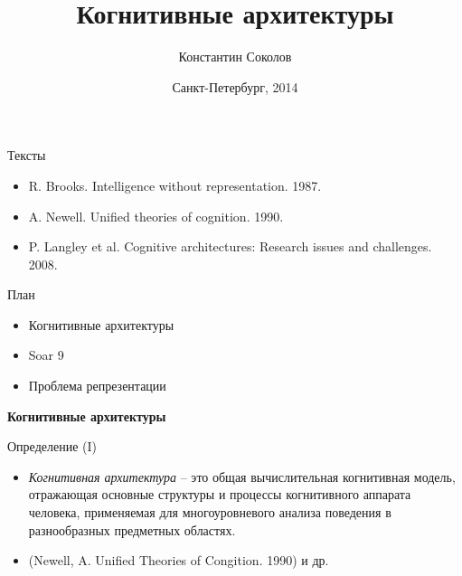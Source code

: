 \documentclass{beamer}
\begin{document}
\title{\Large{Когнитивные архитектуры}}
\author{Константин Соколов}
\date{Санкт-Петербург, 2014} 
\begin{frame}
    \thispagestyle{empty}
    \titlepage
\end{frame}

\begin{frame}{Тексты}
\setcounter{framenumber}{1}
\begin{itemize}
	\item R. Brooks. Intelligence without representation. 1987.
    \medskip
    \item A. Newell. Unified theories of cognition. 1990.
    \medskip
    \item P. Langley et al. Cognitive architectures: Research issues and challenges. 2008.
\end{itemize}
\end{frame}

\begin{frame}{План}
    \begin{itemize}
        \item Когнитивные архитектуры
        \medskip
        \item Soar 9
        \medskip
        \item Проблема репрезентации
        \medskip
    \end{itemize}
\end{frame}


%
%

\begin{frame}{}
\begin{center}
	\textbf{Когнитивные архитектуры}
\end{center}
\end{frame}



\begin{frame}{Определение (I)}
\begin{itemize}
    \item[] \textit{Когнитивная архитектура} -- это общая вычислительная когнитивная модель, отражающая основные структуры и процессы когнитивного аппарата человека, применяемая для многоуровневого анализа поведения в разнообразных предметных областях.
    \item[] \hfill (Newell, A. Unified Theories of Congition. 1990) и др.
\end{itemize}
\end{frame}
\end{document}
